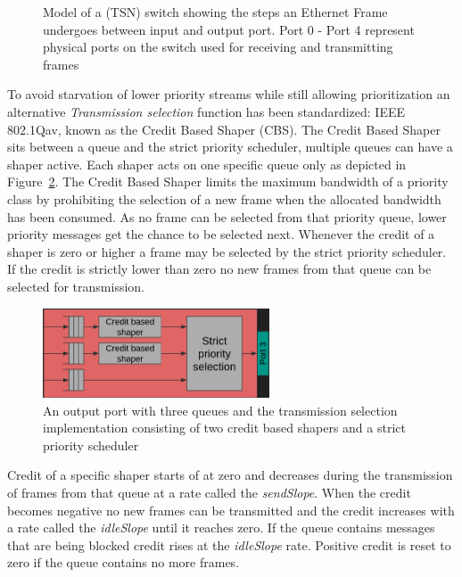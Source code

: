 \begin{figure}[htb]
	\caption{Model of a (TSN) switch showing the steps an Ethernet Frame undergoes between input and output port. Port 0 - Port 4 represent physical ports on the switch used for receiving and transmitting frames}
	\label{fig:switchinternals}
\end{figure} 
To avoid starvation of lower priority streams while still allowing prioritization an alternative \textit{Transmission selection} function has been standardized: IEEE 802.1Qav, known as the Credit Based Shaper (CBS). The Credit Based Shaper sits between a queue and the strict priority scheduler, multiple queues can have a shaper active. Each shaper acts on one specific queue only as depicted in Figure~\ref{fig:cbs}. The Credit Based Shaper limits the maximum bandwidth of a priority class by prohibiting the selection of a new frame when the allocated bandwidth has been consumed. As no frame can be selected from that priority queue, lower priority messages get the chance to be selected next. Whenever the credit of a shaper is zero or higher a frame may be selected by the strict priority scheduler. If the credit is strictly lower than zero no new frames from that queue can be selected for transmission. 
\begin{figure}[htb]
    \centering
    \includegraphics[width=0.6\textwidth]{images/cbs.png}
    \caption{An output port with three queues and the transmission selection implementation consisting of two credit based shapers and a strict priority scheduler}
    \label{fig:cbs}
\end{figure}

Credit of a specific shaper starts of at zero and decreases during the transmission of frames from that queue at a rate called the \textit{sendSlope}. When the credit becomes negative no new frames can be transmitted and the credit increases with a rate called the \textit{idleSlope} until it reaches zero. If the queue contains messages that are being blocked credit rises at the \textit{idleSlope} rate. Positive credit is reset to zero if the queue contains no more frames.

